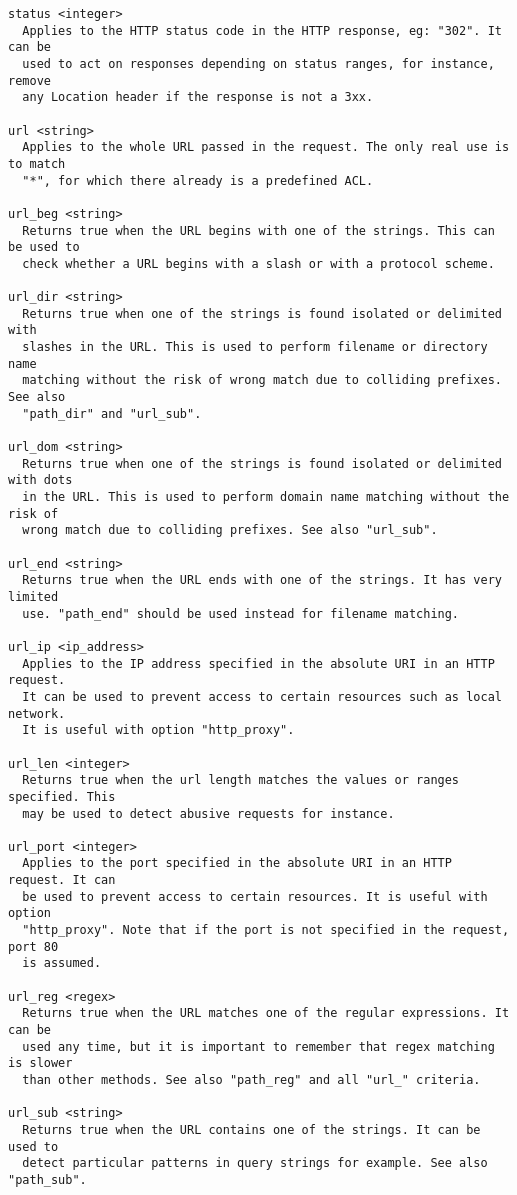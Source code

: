 \begin{verbatim}
status <integer>
  Applies to the HTTP status code in the HTTP response, eg: "302". It can be
  used to act on responses depending on status ranges, for instance, remove
  any Location header if the response is not a 3xx.

url <string>
  Applies to the whole URL passed in the request. The only real use is to match
  "*", for which there already is a predefined ACL.

url_beg <string>
  Returns true when the URL begins with one of the strings. This can be used to
  check whether a URL begins with a slash or with a protocol scheme.

url_dir <string>
  Returns true when one of the strings is found isolated or delimited with
  slashes in the URL. This is used to perform filename or directory name
  matching without the risk of wrong match due to colliding prefixes. See also
  "path_dir" and "url_sub".

url_dom <string>
  Returns true when one of the strings is found isolated or delimited with dots
  in the URL. This is used to perform domain name matching without the risk of
  wrong match due to colliding prefixes. See also "url_sub".

url_end <string>
  Returns true when the URL ends with one of the strings. It has very limited
  use. "path_end" should be used instead for filename matching.

url_ip <ip_address>
  Applies to the IP address specified in the absolute URI in an HTTP request.
  It can be used to prevent access to certain resources such as local network.
  It is useful with option "http_proxy".

url_len <integer>
  Returns true when the url length matches the values or ranges specified. This
  may be used to detect abusive requests for instance.

url_port <integer>
  Applies to the port specified in the absolute URI in an HTTP request. It can
  be used to prevent access to certain resources. It is useful with option
  "http_proxy". Note that if the port is not specified in the request, port 80
  is assumed.

url_reg <regex>
  Returns true when the URL matches one of the regular expressions. It can be
  used any time, but it is important to remember that regex matching is slower
  than other methods. See also "path_reg" and all "url_" criteria.

url_sub <string>
  Returns true when the URL contains one of the strings. It can be used to
  detect particular patterns in query strings for example. See also "path_sub".


\end{verbatim}
